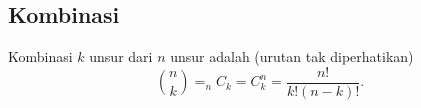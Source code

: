 \subsection{Kombinasi}
Kombinasi $k$ unsur dari $n$ unsur adalah (urutan tak diperhatikan)
$${n \choose k}=_nC_k = C_k^n = \dfrac{n!}{k!(n-k)!}.$$
